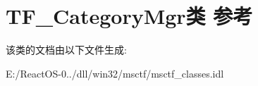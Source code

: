 \hypertarget{class_t_f___category_mgr}{}\section{T\+F\+\_\+\+Category\+Mgr类 参考}
\label{class_t_f___category_mgr}


该类的文档由以下文件生成\+:\begin{DoxyCompactItemize}
\item 
E\+:/\+React\+O\+S-\/0../dll/win32/msctf/msctf\+\_\+classes.\+idl\end{DoxyCompactItemize}
